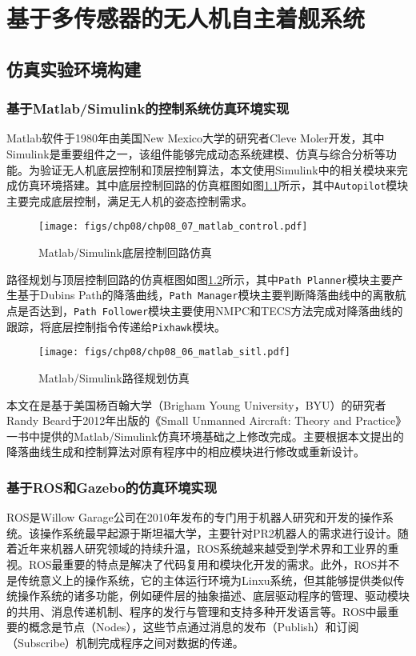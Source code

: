 \chapter{基于多传感器的无人机自主着舰系统}

\section{仿真实验环境构建}
\subsection{基于Matlab/Simulink的控制系统仿真环境实现}
Matlab软件于1980年由美国New Mexico大学的研究者Cleve Moler开发，其中Simulink是重要组件之一，该组件能够完成动态系统建模、仿真与综合分析等功能。为验证无人机底层控制和顶层控制算法，本文使用Simulink中的相关模块来完成仿真环境搭建。其中底层控制回路的仿真框图如图\ref{fig:chp08_07_matlab_control}所示，其中\texttt{Autopilot}模块主要完成底层控制，满足无人机的姿态控制需求。

\begin{figure}[!ht]
	\centering
	\texttt{[image: figs/chp08/chp08\_07\_matlab\_control.pdf]}	
	\caption{Matlab/Simulink底层控制回路仿真}
	\label{fig:chp08_07_matlab_control}
\end{figure}

路径规划与顶层控制回路的仿真框图如图\ref{fig:chp08_06_matlab_sitl}所示，其中\texttt{Path Planner}模块主要产生基于Dubins Path的降落曲线，\texttt{Path Manager}模块主要判断降落曲线中的离散航点是否达到，\texttt{Path Follower}模块主要使用NMPC和TECS方法完成对降落曲线的跟踪，将底层控制指令传递给\texttt{Pixhawk}模块。

\begin{figure}[!ht]
	\centering
	\texttt{[image: figs/chp08/chp08\_06\_matlab\_sitl.pdf]}	
	\caption{Matlab/Simulink路径规划仿真}
	\label{fig:chp08_06_matlab_sitl}
\end{figure}

本文在是基于美国杨百翰大学（Brigham Young University，BYU）的研究者Randy Beard于2012年出版的《Small Unmanned Aircraft: Theory and Practice》一书\cite{beard2012small}中提供的Matlab/Simulink仿真环境基础之上修改完成。主要根据本文提出的降落曲线生成和控制算法对原有程序中的相应模块进行修改或重新设计。

\subsection{基于ROS和Gazebo的仿真环境实现}
ROS是Willow Garage公司在2010年发布的专门用于机器人研究和开发的操作系统。该操作系统最早起源于斯坦福大学，主要针对PR2机器人的需求进行设计。随着近年来机器人研究领域的持续升温，ROS系统越来越受到学术界和工业界的重视。ROS最重要的特点是解决了代码复用和模块化开发的需求。此外，ROS并不是传统意义上的操作系统，它的主体运行环境为Linxu系统，但其能够提供类似传统操作系统的诸多功能，例如硬件层的抽象描述、底层驱动程序的管理、驱动模块的共用、消息传递机制、程序的发行与管理和支持多种开发语言等。ROS中最重要的概念是节点（Nodes），这些节点通过消息的发布（Publish）和订阅（Subscribe）机制完成程序之间对数据的传递。

